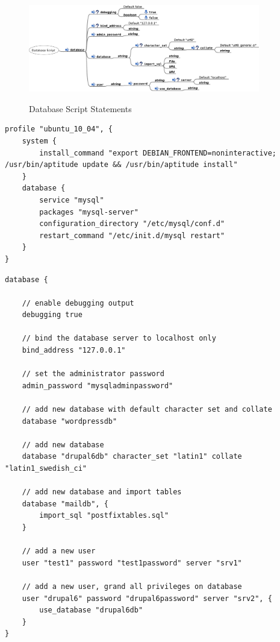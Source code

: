 \begin{figure}
\includegraphics[width=0.9\textwidth]{database_service_script}
\label{fig:database_script_statements}
\caption{Database Script Statements}
\end{figure}

\begin{lstlisting}[style=Java,label=lst:database_ubuntu_profile,caption=Database Example Ubuntu Profile]
profile "ubuntu_10_04", {
    system {
        install_command "export DEBIAN_FRONTEND=noninteractive; /usr/bin/aptitude update && /usr/bin/aptitude install"
    }
    database {
        service "mysql"
        packages "mysql-server"
        configuration_directory "/etc/mysql/conf.d"
        restart_command "/etc/init.d/mysql restart"
    }
}
\end{lstlisting}


\begin{lstlisting}[style=Java,label=lst:database_example_script,caption=Database Example Script]
database {

    // enable debugging output
    debugging true

    // bind the database server to localhost only
    bind_address "127.0.0.1"

    // set the administrator password
    admin_password "mysqladminpassword"

    // add new database with default character set and collate
    database "wordpressdb"

    // add new database
    database "drupal6db" character_set "latin1" collate "latin1_swedish_ci"

    // add new database and import tables
    database "maildb", {
        import_sql "postfixtables.sql"
    }

    // add a new user
    user "test1" password "test1password" server "srv1"

    // add a new user, grand all privileges on database
    user "drupal6" password "drupal6password" server "srv2", {
        use_database "drupal6db"
    }
}
\end{lstlisting}

